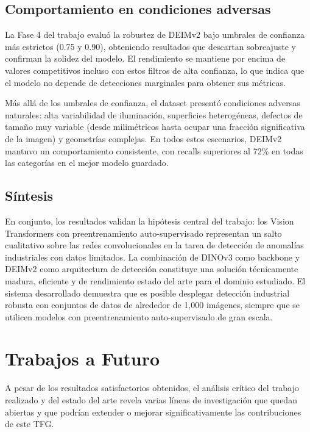 \subsection{Comportamiento en condiciones adversas}

La Fase 4 del trabajo evaluó la robustez de DEIMv2 bajo umbrales de confianza más estrictos (0.75 y 0.90), obteniendo resultados que descartan sobreajuste y confirman la solidez del modelo. El rendimiento se mantiene por encima de valores competitivos incluso con estos filtros de alta confianza, lo que indica que el modelo no depende de detecciones marginales para obtener sus métricas.

Más allá de los umbrales de confianza, el dataset presentó condiciones adversas naturales: alta variabilidad de iluminación, superficies heterogéneas, defectos de tamaño muy variable (desde milimétricos hasta ocupar una fracción significativa de la imagen) y geometrías complejas. En todos estos escenarios, DEIMv2 mantuvo un comportamiento consistente, con recalls superiores al 72\% en todas las categorías en el mejor modelo guardado.

\subsection{Síntesis}

En conjunto, los resultados validan la hipótesis central del trabajo: los Vision Transformers con preentrenamiento auto-supervisado representan un salto cualitativo sobre las redes convolucionales en la tarea de detección de anomalías industriales con datos limitados. La combinación de DINOv3 como backbone y DEIMv2 como arquitectura de detección constituye una solución técnicamente madura, eficiente y de rendimiento estado del arte para el dominio estudiado. El sistema desarrollado demuestra que es posible desplegar detección industrial robusta con conjuntos de datos de alrededor de 1{,}000 imágenes, siempre que se utilicen modelos con preentrenamiento auto-supervisado de gran escala.


\section{Trabajos a Futuro}
\label{sec:trabajos_futuro}

A pesar de los resultados satisfactorios obtenidos, el análisis crítico del trabajo realizado y del estado del arte revela varias líneas de investigación que quedan abiertas y que podrían extender o mejorar significativamente las contribuciones de este TFG.


